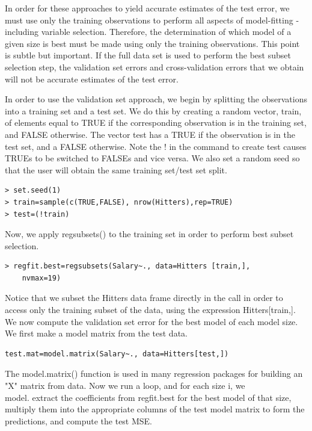 \documentclass[10pt]{article}
\begin{document}
In order for these approaches to yield accurate estimates of the test error, we must use only the training observations to perform all aspects of model-fitting - including variable selection. Therefore, the determination of which model of a given size is best must be made using only the training observations. This point is subtle but important. If the full data set is used to perform the best subset selection step, the validation set errors and cross-validation errors that we obtain will not be accurate estimates of the test error.

In order to use the validation set approach, we begin by splitting the observations into a training set and a test set. We do this by creating a random vector, train, of elements equal to TRUE if the corresponding observation is in the training set, and FALSE otherwise. The vector test has a TRUE if the observation is in the test set, and a FALSE otherwise. Note the ! in the command to create test causes TRUEs to be switched to FALSEs and vice versa. We also set a random seed so that the user will obtain the same training set/test set split.

\begin{verbatim}
> set.seed(1)
> train=sample(c(TRUE,FALSE), nrow(Hitters),rep=TRUE)
> test=(!train)
\end{verbatim}

Now, we apply regsubsets() to the training set in order to perform best subset selection.

\begin{verbatim}
> regfit.best=regsubsets(Salary~., data=Hitters [train,],
    nvmax=19)
\end{verbatim}

Notice that we subset the Hitters data frame directly in the call in order to access only the training subset of the data, using the expression Hitters[train,]. We now compute the validation set error for the best model of each model size. We first make a model matrix from the test data.

\begin{verbatim}
test.mat=model.matrix(Salary~., data=Hitters[test,])
\end{verbatim}

The model.matrix() function is used in many regression packages for building an "X" matrix from data. Now we run a loop, and for each size i, we\\
model. extract the coefficients from regfit.best for the best model of that size, multiply them into the appropriate columns of the test model matrix to form the predictions, and compute the test MSE.
\end{document}
